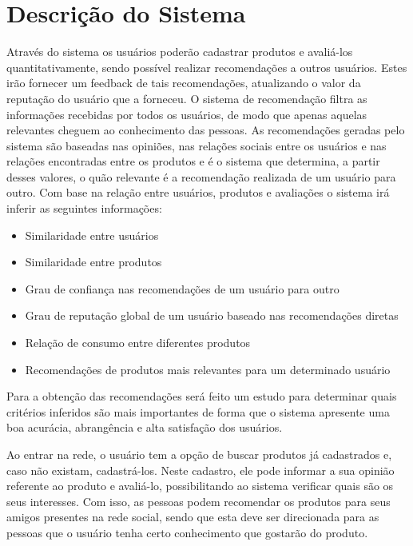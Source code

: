 \section{Descrição do Sistema}


 Através do sistema os usuários poderão cadastrar produtos e avaliá-los quantitativamente, sendo possível realizar recomendações a outros usuários. Estes irão fornecer um feedback de tais recomendações, atualizando o valor da reputação do usuário que a forneceu. O sistema de recomendação filtra as informações recebidas por todos os usuários, de modo que apenas aquelas relevantes cheguem ao conhecimento das pessoas. As recomendações geradas pelo sistema são baseadas nas opiniões, nas relações sociais entre os usuários e nas relações encontradas entre os produtos e é o sistema que determina, a partir desses valores, o quão relevante é a recomendação realizada de um usuário para outro. Com base na relação entre usuários, produtos e avaliações o sistema irá inferir as seguintes informações:
 
\begin{itemize}

 \item Similaridade entre usuários

 \item Similaridade entre produtos

 \item Grau de confiança nas recomendações de um usuário para outro

 \item Grau de reputação global de um usuário baseado nas recomendações diretas

 \item Relação de consumo entre diferentes produtos

 \item Recomendações de produtos mais relevantes para um determinado usuário

\end{itemize}

 Para a obtenção das recomendações será feito um estudo para determinar quais critérios inferidos são mais importantes de forma que o sistema apresente uma boa acurácia, abrangência e alta satisfação dos usuários.


 Ao entrar na rede, o usuário tem a opção de buscar produtos já cadastrados e, caso não existam, cadastrá-los. Neste cadastro, ele pode informar a sua opinião referente ao produto e avaliá-lo, possibilitando ao sistema verificar quais são os seus interesses. Com isso, as pessoas podem recomendar os produtos para seus amigos presentes na rede social, sendo que esta deve ser direcionada para as pessoas que o usuário tenha certo conhecimento que gostarão do produto.

